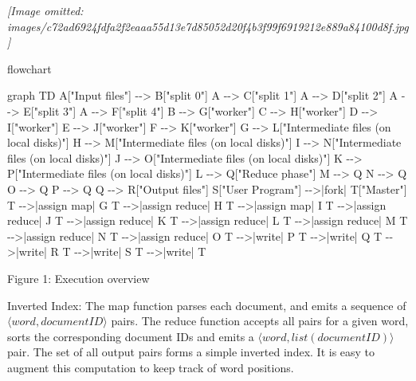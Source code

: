 \documentclass[
]{article}
\newenvironment{Shaded}{}{}
\newcommand{\NormalTok}[1]{#1}
\begin{document}
\textit{[Image omitted: images/c72ad6924fdfa2f2eaaa55d13e7d85052d20f4b3f99f6919212e889a84100d8f.jpg]}

flowchart

\begin{Shaded}
\begin{Highlighting}[]
\NormalTok{graph TD}
\NormalTok{    A["Input files"] {-}{-}\textgreater{} B["split 0"]}
\NormalTok{    A {-}{-}\textgreater{} C["split 1"]}
\NormalTok{    A {-}{-}\textgreater{} D["split 2"]}
\NormalTok{    A {-}{-}\textgreater{} E["split 3"]}
\NormalTok{    A {-}{-}\textgreater{} F["split 4"]}
\NormalTok{    B {-}{-}\textgreater{} G["worker"]}
\NormalTok{    C {-}{-}\textgreater{} H["worker"]}
\NormalTok{    D {-}{-}\textgreater{} I["worker"]}
\NormalTok{    E {-}{-}\textgreater{} J["worker"]}
\NormalTok{    F {-}{-}\textgreater{} K["worker"]}
\NormalTok{    G {-}{-}\textgreater{} L["Intermediate files (on local disks)"]}
\NormalTok{    H {-}{-}\textgreater{} M["Intermediate files (on local disks)"]}
\NormalTok{    I {-}{-}\textgreater{} N["Intermediate files (on local disks)"]}
\NormalTok{    J {-}{-}\textgreater{} O["Intermediate files (on local disks)"]}
\NormalTok{    K {-}{-}\textgreater{} P["Intermediate files (on local disks)"]}
\NormalTok{    L {-}{-}\textgreater{} Q["Reduce phase"]}
\NormalTok{    M {-}{-}\textgreater{} Q}
\NormalTok{    N {-}{-}\textgreater{} Q}
\NormalTok{    O {-}{-}\textgreater{} Q}
\NormalTok{    P {-}{-}\textgreater{} Q}
\NormalTok{    Q {-}{-}\textgreater{} R["Output files"]}
\NormalTok{    S["User Program"] {-}{-}\textgreater{}|fork| T["Master"]}
\NormalTok{    T {-}{-}\textgreater{}|assign map| G}
\NormalTok{    T {-}{-}\textgreater{}|assign reduce| H}
\NormalTok{    T {-}{-}\textgreater{}|assign map| I}
\NormalTok{    T {-}{-}\textgreater{}|assign reduce| J}
\NormalTok{    T {-}{-}\textgreater{}|assign reduce| K}
\NormalTok{    T {-}{-}\textgreater{}|assign reduce| L}
\NormalTok{    T {-}{-}\textgreater{}|assign reduce| M}
\NormalTok{    T {-}{-}\textgreater{}|assign reduce| N}
\NormalTok{    T {-}{-}\textgreater{}|assign reduce| O}
\NormalTok{    T {-}{-}\textgreater{}|write| P}
\NormalTok{    T {-}{-}\textgreater{}|write| Q}
\NormalTok{    T {-}{-}\textgreater{}|write| R}
\NormalTok{    T {-}{-}\textgreater{}|write| S}
\NormalTok{    T {-}{-}\textgreater{}|write| T}
\end{Highlighting}
\end{Shaded}

Figure 1: Execution overview

Inverted Index: The map function parses each document, and emits a
sequence of \(\langle word, document ID \rangle\) pairs. The reduce
function accepts all pairs for a given word, sorts the corresponding
document IDs and emits a \(\langle word, list(document ID) \rangle\)
pair. The set of all output pairs forms a simple inverted index. It is
easy to augment this computation to keep track of word positions.
\end{document}
